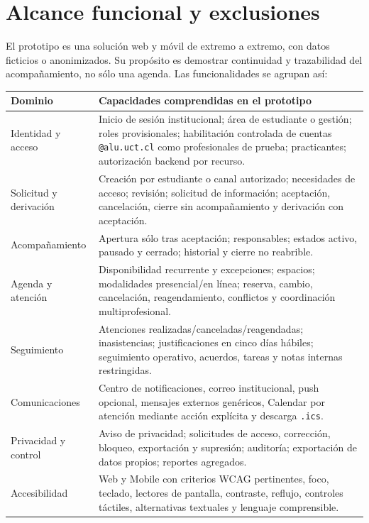 \documentclass[10pt,a4paper,oneside]{article}
\begin{document}
\section{Alcance funcional y exclusiones}

El prototipo es una solución web y móvil de extremo a extremo, con datos ficticios o anonimizados. Su propósito es demostrar continuidad y trazabilidad del acompañamiento, no sólo una agenda. Las funcionalidades se agrupan así:

\small
\begin{tabularx}{\textwidth}{@{}L{0.22\textwidth}Y@{}}
\toprule
\textbf{Dominio} & \textbf{Capacidades comprendidas en el prototipo}\\
\midrule
Identidad y acceso & Inicio de sesión institucional; área de estudiante o gestión; roles provisionales; habilitación controlada de cuentas \texttt{@alu.uct.cl} como profesionales de prueba; practicantes; autorización backend por recurso.\\
Solicitud y derivación & Creación por estudiante o canal autorizado; necesidades de acceso; revisión; solicitud de información; aceptación, cancelación, cierre sin acompañamiento y derivación con aceptación.\\
Acompañamiento & Apertura sólo tras aceptación; responsables; estados activo, pausado y cerrado; historial y cierre no reabrible.\\
Agenda y atención & Disponibilidad recurrente y excepciones; espacios; modalidades presencial/en línea; reserva, cambio, cancelación, reagendamiento, conflictos y coordinación multiprofesional.\\
Seguimiento & Atenciones realizadas/canceladas/reagendadas; inasistencias; justificaciones en cinco días hábiles; seguimiento operativo, acuerdos, tareas y notas internas restringidas.\\
Comunicaciones & Centro de notificaciones, correo institucional, push opcional, mensajes externos genéricos, Calendar por atención mediante acción explícita y descarga \texttt{.ics}.\\
Privacidad y control & Aviso de privacidad; solicitudes de acceso, corrección, bloqueo, exportación y supresión; auditoría; exportación de datos propios; reportes agregados.\\
Accesibilidad & Web y Mobile con criterios WCAG pertinentes, foco, teclado, lectores de pantalla, contraste, reflujo, controles táctiles, alternativas textuales y lenguaje comprensible.\\
\bottomrule
\end{tabularx}
\normalsize
\end{document}
